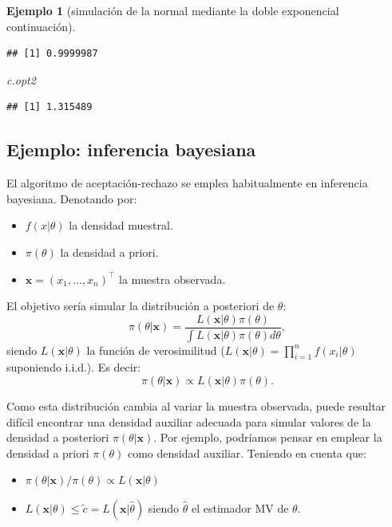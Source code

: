 \documentclass[
]{book}
\newenvironment{Shaded}{\begin{snugshade}}{\end{snugshade}}
\newcommand{\NormalTok}[1]{#1}
\theoremstyle{break}
\newtheorem{example}{Ejemplo}[chapter]
\theoremstyle{nonumberplain}
\begin{document}
\begin{example}[simulación de la normal mediante la doble exponencial continuación]
\begin{verbatim}
## [1] 0.9999987
\end{verbatim}

\begin{Shaded}
\begin{Highlighting}[]
\NormalTok{c.opt2}
\end{Highlighting}
\end{Shaded}

\begin{verbatim}
## [1] 1.315489
\end{verbatim}

\end{example}

\hypertarget{bayes-ar}{%
\subsection{Ejemplo: inferencia bayesiana}\label{bayes-ar}}

El algoritmo de aceptación-rechazo se emplea habitualmente en inferencia bayesiana.
Denotando por:

\begin{itemize}
\item
  \(f(x|\theta)\) la densidad muestral.
\item
  \(\pi(\theta)\) la densidad a priori.
\item
  \(\mathbf{x}=(x_1,...,x_n)^{\top}\) la muestra observada.
\end{itemize}

El objetivo sería simular la distribución a posteriori de \(\theta\):
\[\pi(\theta|\mathbf{x}) = \frac{L(\mathbf{x}|\theta)\pi(\theta)}{\int L(\mathbf{x}|\theta)\pi(\theta)d\theta},\]
siendo \(L(\mathbf{x}|\theta)\) la función de verosimilitud (\(L(\mathbf{x}|\theta) = \prod\limits_{i=1}^{n}f(x_i|\theta)\) suponiendo i.i.d.).
Es decir:
\[\pi(\theta | \mathbf{x})\propto L(\mathbf{x}| \theta)\pi(\theta).\]

Como esta distribución cambia al variar la muestra observada, puede resultar difícil encontrar una densidad auxiliar adecuada para simular valores de la densidad a posteriori \(\pi(\theta|\mathbf{x})\).
Por ejemplo, podríamos pensar en emplear la densidad a priori \(\pi(\theta)\) como densidad auxiliar.
Teniendo en cuenta que:

\begin{itemize}
\item
  \(\pi(\theta |\mathbf{x})/\pi(\theta)\propto L(\mathbf{x}|\theta)\)
\item
  \(L(\mathbf{x}|\theta)\leq \tilde{c}=L(\mathbf{x}|\hat{\theta})\) siendo
  \(\hat{\theta}\) el estimador MV de \(\theta\).
\end{itemize}
\end{document}
